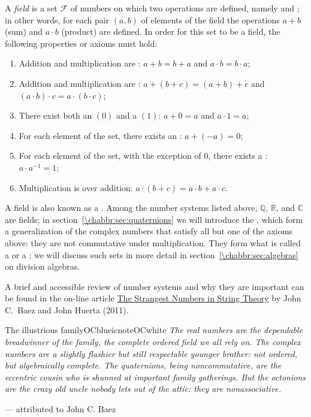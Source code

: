 A \textit{field} is a set $\mathcal{F}$ of numbers on which two operations are defined, namely  and ; in other words, for each pair $(a,b)$ of elements of the field the operations $a+b$ (sum) and $a\cdot b$ (product) are defined.  In order for this set to be a field, the following properties or axioms must hold:
\begin{enumerate}
\item Addition and multiplication are : $a+b=b+a$ and $a\cdot b=b\cdot a$;
\item Addition and multiplication are : $a+(b+c)=(a+b)+c$ and $(a\cdot b)\cdot c=a\cdot (b\cdot c)$;
\item There exist both an  $(0)$ and a  $(1)$: $a+0=a$ and $a\cdot 1=a$;
\item For each element of the set, there exists an : $a+(-a)=0$;
\item For each element of the set, with the exception of $0$, there exists a : $a\cdot a^{-1} = 1$;
\item Multiplication is  over addition: $a\cdot(b+c)=a\cdot b+a\cdot c$.
\end{enumerate}
A field is also known as a .  Among the number systems listed above, $\mathbb{Q}$, $\mathbb{R}$, and $\mathbb{C}$ are fields; in section~\ref{\chabbr:sec:quaternions} we will introduce the , which form a generalization of the complex numbers that satisfy all but one of the axioms above: they are not commutative under multiplication.  They form what is called a  or a ; we will discuss such sets in more detail in section~\ref{\chabbr:sec:algebras} on division algebras.

A brief and accessible review of number systems and why they are important can be found in the on-line article {\color{OCblue}\href{https://smphysics.wordpress.com/wp-content/uploads/2011/08/numero_extrano_cuerdas.pdf}{The Strangest Numbers in String Theory}} by John C.\ Baez and John Huerta (2011).  

\begin{messagebox}{The illustrious family}{OCblue}{icnote}{OCwhite}
\textit{The real numbers are the dependable breadwinner of the family, the complete ordered field we all rely on. The complex numbers are a slightly flashier but still respectable younger brother: not ordered, but algebraically complete. The quaternions, being noncommutative, are the eccentric cousin who is shunned at important family gatherings. But the octonions are the crazy old uncle nobody lets out of the attic: they are nonassociative.} 
\begin{flushright} --- attributed to John C. Baez\end{flushright} 
\end{messagebox} 


